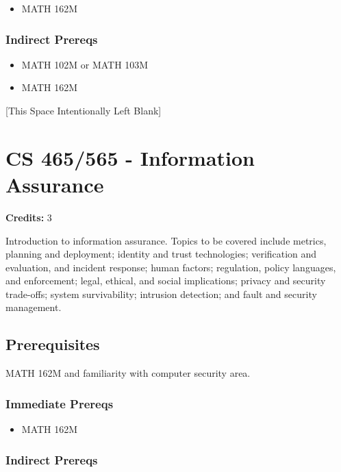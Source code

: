 \documentclass[]{article}
\providecommand{\tightlist}{%
  \setlength{\itemsep}{0pt}\setlength{\parskip}{0pt}}
\newcommand{\pagebreakhere}{
\vspace*{\fill}
\begin{center}
[This Space Intentionally Left Blank]
\end{center}
\vspace*{\fill}
\newpage
}
\begin{document}
\begin{itemize}
\tightlist
\item
  MATH 162M
\end{itemize}

\subsubsection{Indirect Prereqs}\label{indirect-prereqs-32}

\begin{itemize}
\tightlist
\item
  MATH 102M or MATH 103M
\item
  MATH 162M
\end{itemize}

\pagebreakhere
\section{CS 465/565 - Information
Assurance}\label{cs-465565---information-assurance}

\textbf{Credits:} 3

Introduction to information assurance. Topics to be covered include
metrics, planning and deployment; identity and trust technologies;
verification and evaluation, and incident response; human factors;
regulation, policy languages, and enforcement; legal, ethical, and
social implications; privacy and security trade-offs; system
survivability; intrusion detection; and fault and security management.

\subsection{Prerequisites}\label{prerequisites-42}

MATH 162M and familiarity with computer security area.

\subsubsection{Immediate Prereqs}\label{immediate-prereqs-33}

\begin{itemize}
\tightlist
\item
  MATH 162M
\end{itemize}

\subsubsection{Indirect Prereqs}\label{indirect-prereqs-33}
\end{document}
